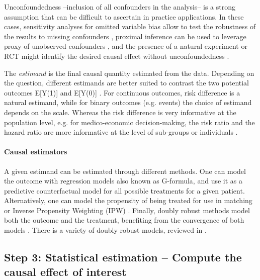 \documentclass[10pt,letterpaper]{article}
\providecommand{\DIFaddtex}[1]{{\protect\color{blue}\uwave{#1}}} %
\providecommand{\DIFaddbegin}{} %
\providecommand{\DIFaddend}{} %
\providecommand{\DIFdelbegin}{} %
\providecommand{\DIFdelend}{} %
\providecommand{\DIFadd}[1]{\texorpdfstring{\DIFaddtex{#1}}{#1}} %
\newcommand{\DIFscaledelfig}{0.5}
\newlength{\DIFdelgraphicswidth} %
\newlength{\DIFdelgraphicsheight} %
\newcommand{\DIFaddincludegraphics}[2][]{{\color{blue}\fbox{\DIFOincludegraphics[#1]{#2}}}} %
\newcommand{\DIFdelincludegraphics}[2][]{%
\sbox{\DIFdelgraphicsbox}{\DIFOincludegraphics[#1]{#2}}%
\settoboxwidth{\DIFdelgraphicswidth}{\DIFdelgraphicsbox} %
\settoboxtotalheight{\DIFdelgraphicsheight}{\DIFdelgraphicsbox} %
\scalebox{\DIFscaledelfig}{%
\parbox[b]{\DIFdelgraphicswidth}{\usebox{\DIFdelgraphicsbox}\\[-\baselineskip] \rule{\DIFdelgraphicswidth}{0em}}\llap{\resizebox{\DIFdelgraphicswidth}{\DIFdelgraphicsheight}{%
\setlength{\unitlength}{\DIFdelgraphicswidth}%
\begin{picture}(1,1)%
\thicklines\linethickness{2pt} %
{\color[rgb]{1,0,0}\put(0,0){\framebox(1,1){}}}%
{\color[rgb]{1,0,0}\put(0,0){\line( 1,1){1}}}%
{\color[rgb]{1,0,0}\put(0,1){\line(1,-1){1}}}%
\end{picture}%
}\hspace*{3pt}}} %
} %
\DeclareRobustCommand{\DIFaddbegin}{\DIFOaddbegin \let\includegraphics\DIFaddincludegraphics} %
\DeclareRobustCommand{\DIFaddend}{\DIFOaddend \let\includegraphics\DIFOincludegraphics} %
\DeclareRobustCommand{\DIFdelbegin}{\DIFOdelbegin \let\includegraphics\DIFdelincludegraphics} %
\DeclareRobustCommand{\DIFdelend}{\DIFOaddend \let\includegraphics\DIFOincludegraphics} %
\begin{document}
Unconfoundedness --inclusion of all confounders in the analysis-- is a strong
assumption that can be difficult to ascertain in practice applications. In these cases,
sensitivity analyses for omitted variable bias allow to test the robustness of
the results to missing confounders \cite{cinelli2020making}, proximal inference
can be used to leverage proxy of unobserved confounders
\cite{tchetgen2024introduction}, and the presence of a natural experiment or RCT might
identify the desired causal effect without unconfoundedness \cite[Chapter 5,
  9]{wager2020stats}.

The
\emph{estimand} is the final causal quantity estimated from the data.
Depending on the question, different estimands are better suited to contrast
the two potential outcomes E[Y(1)] and E[Y(0)] \cite{imbens_nonparametric_2004,colnet2023risk}. For continuous outcomes, risk
difference is a natural estimand, while for binary outcomes (e.g. events) the
choice of estimand depends on the scale. Whereas the risk difference is very
informative at the population level, e.g. for medico-economic decision-making,
the risk ratio and the hazard ratio are more informative at the level of
sub-groups or individuals \cite{colnet2023risk}.

\paragraph{Causal estimators}

A given estimand can be estimated through different methods. One can model the
outcome with regression models also known as
G-formula, \cite{robins1986role} and use it as a predictive counterfactual model
for all possible treatments for a given patient. Alternatively, one can model
the propensity of being treated for use in matching or Inverse Propensity
Weighting (IPW) \cite{austin2015moving}. Finally, doubly robust methods model
both the outcome and the treatment, benefiting from the convergence of both
models \cite{wager2020stats}. There is a variety of doubly robust models,
reviewed in \DIFdelbegin %
\DIFdelend \DIFaddbegin \DIFadd{S2 Appendix}\DIFaddend .

\subsection*{Step 3: Statistical estimation -- Compute the causal effect of interest}\label{sec:estimation}

%
\end{document}
